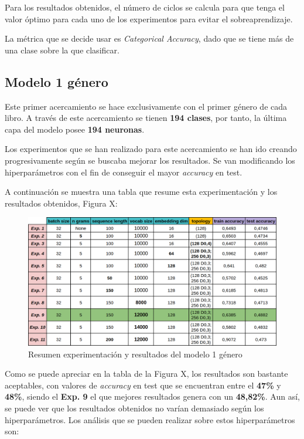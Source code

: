 \documentclass[12pt,a4paper, xcolor=table]{article}
\begin{document}
Para los resultados obtenidos, el número de ciclos se calcula para que tenga el valor óptimo para cada uno de los experimentos para evitar el sobreaprendizaje.

\vspace{2mm}

La métrica que se decide usar es \textit{Categorical Accuracy}, dado que se tiene más de una clase sobre la que clasificar.


\subsection{Modelo 1 género}

Este primer acercamiento se hace exclusivamente con el primer género de cada libro. A través de este acercamiento se tienen \textbf{194 clases}, por tanto, la última capa del modelo posee \textbf{194 neuronas}.

\vspace{2mm}

Los experimentos que se han realizado para este acercamiento se han ido creando progresivamente según se buscaba mejorar los resultados. Se van modificando los hiperparámetros con el fin de conseguir el mayor \textit{accuracy} en test.

\vspace{1mm}

A continuación se muestra una tabla que resume esta experimentación y los resultados obtenidos, Figura X:

\newpage

\begin{figure}[!h]
    \centering
    \includegraphics[width=500px]{img/one.png}
    \caption{Resumen experimentación y resultados del modelo 1 género}
\end{figure}

Como se puede apreciar en la tabla de la Figura X, los resultados son bastante aceptables, con valores de \textit{accuracy} en test que se encuentran entre el \textbf{47\%} y \textbf{48\%}, siendo el \textbf{Exp. 9} el que mejores resultados genera con un \textbf{48,82\%}. Aun así, se puede ver que los resultados obtenidos no varían demasiado según los hiperparámetros. Los análisis que se pueden realizar sobre estos hiperparámetros son:
\end{document}
